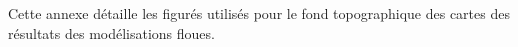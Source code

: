 Cette annexe détaille les figurés utilisés pour le fond topographique
des cartes des résultats des modélisations floues.

\begin{figure}[h]
  \centering
  
\end{figure}

